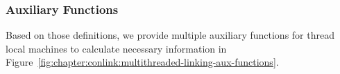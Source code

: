 \subsubsection{Auxiliary Functions}

Based on those definitions, we provide multiple auxiliary functions 
for thread local machines to calculate necessary information in Figure~\ref{fig:chapter:conlink:multithreaded-linking-aux-functions}.


